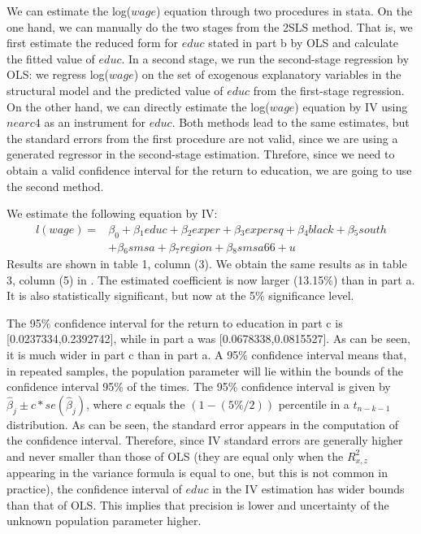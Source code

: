 \documentclass[a4paper, 12pt, twoside]{article}
\begin{document}
We can estimate the log($wage$) equation through two procedures in stata. On the one hand, we can manually do the two stages from the 2SLS method. That is, we first estimate the reduced form for $educ$ stated in part b by OLS and calculate the fitted value of $educ$. In a second stage, we run the second-stage regression by OLS: we regress log($wage$) on the set of exogenous explanatory variables in the structural model and the predicted value of $educ$ from the first-stage regression. On the other hand, we can directly estimate the log($wage$) equation by IV using $nearc4$ as an instrument for $educ$. Both methods lead to the same estimates, but the standard errors from the first procedure are not valid, since we are using a generated regressor in the second-stage estimation. Threfore, since we need to obtain a valid confidence interval for the return to education, we are going to use the second method. 
\par\vspace{\baselineskip}
We estimate the following equation by IV:
\begin{equation*}
\begin{split}
l(wage)=&\beta_0+\beta{_1}educ+\beta{_2}exper+\beta{_3}expersq+\beta{_4}black+\beta{_5}south\\
&+\beta{_6}smsa+\beta{_7}region+\beta{_8}smsa66+u
\end{split}
\end{equation*}
Results are shown in table 1, column (3). We obtain the same results as in table 3, column (5) in \cite{Card}. The estimated coefficient is now larger (13.15\%) than in part a. It is also statistically significant, but now at the 5\% significance level.
\par\vspace{\baselineskip}

The 95\% confidence interval for the return to education in part c is [0.0237334,0.2392742], while in part a was  [0.0678338,0.0815527]. As can be seen, it is much wider in part c than in part a. A 95\% confidence interval means that, in repeated samples, the population parameter will lie within the bounds of the confidence interval 95\% of the times. The 95\% confidence interval is given by $\hat{\beta}_j\pm c*se(\hat{\beta}_j)$, where $c$ equals the $(1-(5\%/2))$ percentile in a $t_{n-k-1}$ distribution. As can be seen, the standard error appears in the computation of the confidence interval. Therefore, since IV standard errors are generally higher and never smaller than those of OLS (they are equal only when the $R^2_{x,z}$ appearing in the variance formula is equal to one, but this is not common in practice), the confidence interval of $educ$ in the IV estimation has wider bounds than that of OLS. This implies that precision is lower and uncertainty of the unknown population parameter higher.
\par\vspace{\baselineskip}
\end{document}
